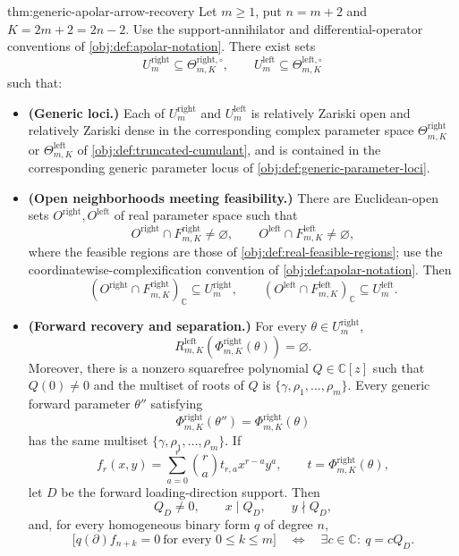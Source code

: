 \begin{theoremv}{thm:generic-apolar-arrow-recovery}
Let \(m\geq 1\), put \(n=m+2\) and \(K=2m+2=2n-2\). Use the support-annihilator and differential-operator conventions of \cref{obj:def:apolar-notation}.  There exist sets
\[
U_m^{\mathrm{right}}\subseteq \Theta^{\mathrm{right},\circ}_{m,K},
\qquad
U_m^{\mathrm{left}}\subseteq \Theta^{\mathrm{left},\circ}_{m,K}
\]
such that:

\begin{itemize}
\item \textbf{(Generic loci.)} Each of \(U_m^{\mathrm{right}}\) and \(U_m^{\mathrm{left}}\) is relatively Zariski open and relatively Zariski dense in the corresponding complex parameter space \(\Theta^{\mathrm{right}}_{m,K}\) or \(\Theta^{\mathrm{left}}_{m,K}\) of \cref{obj:def:truncated-cumulant}, and is contained in the corresponding generic parameter locus of \cref{obj:def:generic-parameter-loci}.

\item \textbf{(Open neighborhoods meeting feasibility.)} There are Euclidean-open sets \(O^{\mathrm{right}},O^{\mathrm{left}}\) of real parameter space such that
\[
O^{\mathrm{right}}\cap F^{\mathrm{right}}_{m,K}\neq\varnothing,
\qquad
O^{\mathrm{left}}\cap F^{\mathrm{left}}_{m,K}\neq\varnothing,
\]
where the feasible regions are those of \cref{obj:def:real-feasible-regions}; use the coordinatewise-complexification convention of \cref{obj:def:apolar-notation}. Then
\[
\left(O^{\mathrm{right}}\cap F^{\mathrm{right}}_{m,K}\right)_{\mathbb C}
 \subseteq U_m^{\mathrm{right}},
\qquad
\left(O^{\mathrm{left}}\cap F^{\mathrm{left}}_{m,K}\right)_{\mathbb C}
 \subseteq U_m^{\mathrm{left}}.
\]

\item \textbf{(Forward recovery and separation.)} For every \(\theta\in U_m^{\mathrm{right}}\),
\[
R^{\mathrm{left}}_{m,K}\!\left(\Phi^{\mathrm{right}}_{m,K}(\theta)\right)=\varnothing.
\]
Moreover, there is a nonzero squarefree polynomial \(Q\in\mathbb C[z]\) such that
\(Q(0)\neq0\) and the multiset of roots of \(Q\) is
\(\{\gamma,\rho_1,\ldots,\rho_m\}\). Every generic forward parameter \(\theta''\) satisfying
\[
\Phi^{\mathrm{right}}_{m,K}(\theta'')=
\Phi^{\mathrm{right}}_{m,K}(\theta)
\]
has the same multiset \(\{\gamma,\rho_1,\ldots,\rho_m\}\).  If
\[
f_r(x,y)=\sum_{a=0}^{r}\binom{r}{a}t_{r,a}x^{r-a}y^a,
\qquad
t=\Phi^{\mathrm{right}}_{m,K}(\theta),
\]
let \(D\) be the forward loading-direction support. Then
\[
Q_D\neq0,\qquad x\mid Q_D,\qquad y\nmid Q_D,
\]
and, for every homogeneous binary form \(q\) of degree \(n\),
\[
\bigl[q(\partial)f_{n+k}=0\ \text{for every }0\leq k\leq m\bigr]
\quad\Longleftrightarrow\quad
\exists c\in\mathbb C:\ q=cQ_D.
\]


\end{itemize}
\end{theoremv}
